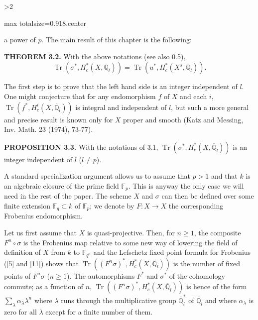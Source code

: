 \documentclass[9pt,twoside]{extarticle}
\newcommand{\EditionPage}[3]{%
  \ifnum#1>2\clearpage\fi
  \pdfbookmark[1]{Printed page #2}{en-folio-#2}%
  \hypertarget{en-physical-#1}{}%
  \noindent\begin{adjustbox}{max totalsize={\textwidth}{0.918\textheight},center}
  \begin{minipage}[t]{\textwidth}
  \fontsize{9.4}{11.1}\selectfont\justifying
  #3
  \end{minipage}
  \end{adjustbox}%
}
\begin{document}
\EditionPage{18}{119}{%
a power of \(p\). The main result of this chapter is the following:\par

\noindent\textbf{THEOREM 3.2.} With the above notations (see also 0.5), \[
\operatorname{Tr}(\sigma^*,H_c^*(X,\overline{\mathbb Q}_l))
=
\operatorname{Tr}(u^*,H_c^*(X^s,\overline{\mathbb Q}_l)).
\]\par

The first step is to prove that the left hand side is an integer independent of \(l\). One might conjecture that for any endomorphism \(f\) of \(X\) and each \(i\), \(\operatorname{Tr}(f^*,H_c^i(X,\overline{\mathbb Q}_l))\) is integral and independent of \(l\), but such a more general and precise result is known only for \(X\) proper and smooth (Katz and Messing, Inv. Math. 23 (1974), 73-77).\par

\noindent\textbf{PROPOSITION 3.3.} With the notations of 3.1, \(\operatorname{Tr}(\sigma^*,H_c^*(X,\overline{\mathbb Q}_l))\) is an integer independent of \(l\) (\(l\ne p\)).\par

A standard specialization argument allows us to assume that \(p>1\) and that \(k\) is an algebraic closure of the prime field \(\mathbb F_p\). This is anyway the only case we will need in the rest of the paper. The scheme \(X\) and \(\sigma\) can then be defined over some finite extension \(\mathbb F_q\subset k\) of \(\mathbb F_p\); we denote by \(F:X\to X\) the corresponding Frobenius endomorphism.\par

Let us first assume that \(X\) is quasi-projective. Then, for \(n\ge1\), the composite \(F^n\circ\sigma\) is the Frobenius map relative to some new way of lowering the field of definition of \(X\) from \(k\) to \(\mathbb F_{q^n}\) and the Lefschetz fixed point formula for Frobenius ([5] and [11]) shows that \(\operatorname{Tr}((F^n\sigma)^*,H_c^*(X,\overline{\mathbb Q}_l))\) is the number of fixed points of \(F^n\sigma\) (\(n\ge1\)). The automorphisms \(F^*\) and \(\sigma^*\) of the cohomology commute; as a function of \(n\), \(\operatorname{Tr}((F^n\sigma)^*,H_c^*(X,\overline{\mathbb Q}_l))\) is hence of the form \(\sum_\lambda\alpha_\lambda\lambda^n\) where \(\lambda\) runs through the multiplicative group \(\overline{\mathbb Q}_l^*\) of \(\overline{\mathbb Q}_l\) and where \(\alpha_\lambda\) is zero for all \(\lambda\) except for a finite number of them.\par

}
\end{document}
